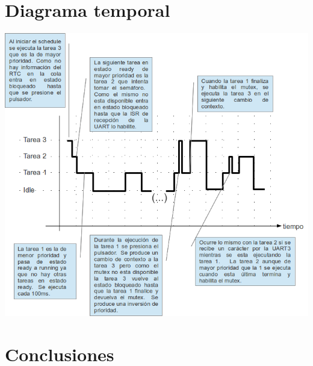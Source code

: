 \documentclass[a4paper,12pt]{article}
\begin{document}
\section{Diagrama temporal}

\includegraphics[width=1\textwidth,angle=0]{./imagenes/diagrama-temporal.png}\\

\section{Conclusiones}
\end{document}
